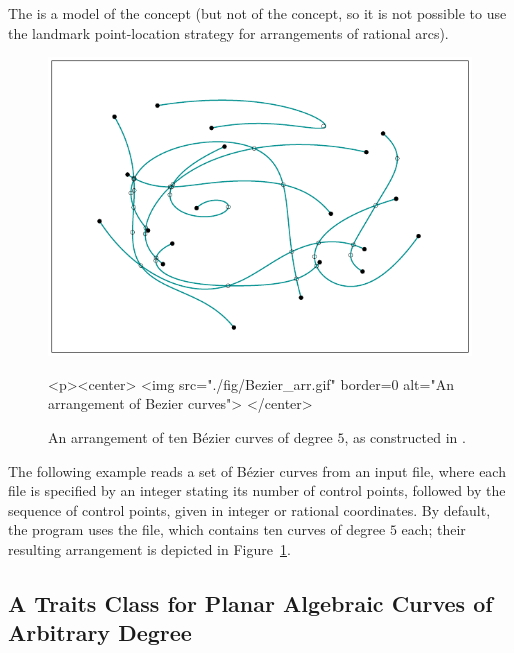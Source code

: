 The  is a model of the
 concept (but not of the
 concept, so it is not possible
to use the landmark point-location strategy for arrangements of
rational arcs).

\begin{figure}[t]
\begin{ccTexOnly}
  \begin{center}
  \includegraphics{Arrangement_on_surface_2/fig/Bezier_arr}
  \end{center}
\end{ccTexOnly}
\begin{ccHtmlOnly}
  <p><center>
  <img src="./fig/Bezier_arr.gif" border=0 alt="An arrangement of Bezier curves">
  </center>
\end{ccHtmlOnly}
\caption{An arrangement of ten B\'ezier curves of degree $5$, as
constructed in .\label{arr_fig:ex_bez}}
\end{figure}

The following example reads a set of B\'ezier curves from an input
file, where each file is specified by an integer stating its number
of control points, followed by the sequence of control points, given
in integer or rational coordinates. By default, the program uses
the  file, which contains ten curves of degree $5$
each; their resulting arrangement is depicted in
Figure~\ref{arr_fig:ex_bez}.


\subsection{A Traits Class for Planar Algebraic Curves
of Arbitrary Degree\label{arr_ssec:tr_alg}}

